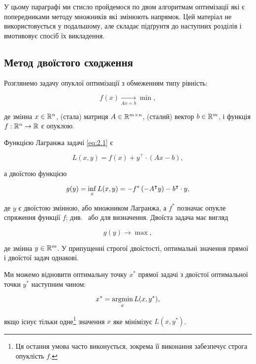 У цьому параграфі ми стисло пройдемося по двом алгоритмам оптимізації які є попередниками методу множників які змінюють напрямок. Цей матеріал не використовується у подальшому, але складає підґрунтя до наступних розділів і вмотивовує спосіб їх викладення.

\subsection{Метод двоїстого сходження}

Розглянемо задачу опуклої оптимізації з обмеженням типу рівність:

\begin{equation}
	\label{eq:2.1}	
	f(x) \xrightarrow[A x = b]{} \min,
\end{equation}

де змінна $x \in \mathbb{R}^n$, (стала) матриця $A \in \mathbb{R}^{m \times n}$, (сталий) вектор $b \in \mathbb{R}^m$, і функція $f: \mathbb{R}^n \to \mathbb{R}$ є опуклою. \medskip

Функцією Лагранжа задачі \eqref{eq:2.1} є

\begin{equation}
	L(x, y) = f(x) + y^\intercal \cdot (A x - b),
\end{equation}

а двоїстою функцією

\begin{equation}
	g(y) = \operatorname*{inf}_x L(x, y) = - f^* \left( - A^\intercal y \right) - b^\intercal \cdot y,
\end{equation}

де $y$ є двоїстою змінною, або множником Лагранжа, а $f^*$ позначає опукле спряження функції $f$; див.~\cite[\S3.3]{20} або \cite[\S12]{140} для визначення. Двоїста задача має вигляд

\begin{equation}
	g(y) \to \max,
\end{equation}

де змінна $y \in \mathbb{R}^m$. У припущенні строгої двоїстості, оптимальні значення прямої і двоїстої задач однакові. 

Ми можемо відновити оптимальну точку $x^*$ прямої задачі з двоїстої оптимальної точки $y^*$ наступним чином:

\begin{equation}
	x^* = \operatorname*{argmin}_x L(x, y^*),
\end{equation}

якщо існує тільки одне\footnote{Ця остання умова часто виконується, зокрема її виконання забезпечує строга опуклість $f$.} значення $x$ яке мінімізує $L(x, y^*)$. 


